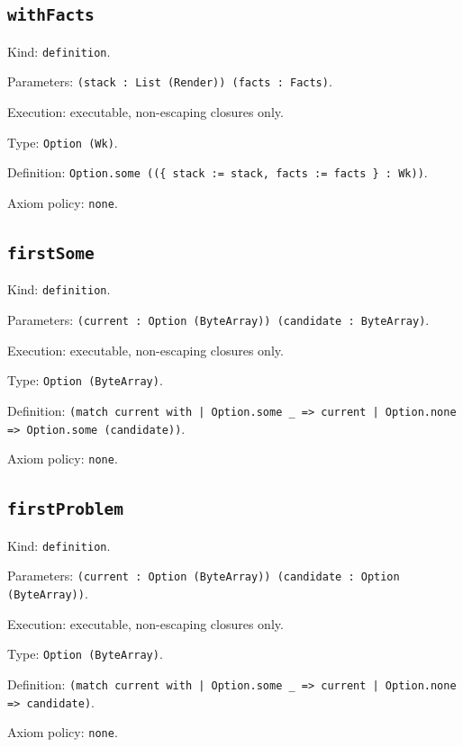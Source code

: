 \documentclass[11pt]{article}
\begin{document}
\subsection*{\texttt{withFacts}}
\noindent Kind: \texttt{definition}.\par
\noindent Parameters: \texttt{(stack : List (Render)) (facts : Facts)}.\par
\noindent Execution: executable, non-escaping closures only.\par
\noindent Type: \texttt{Option (Wk)}.\par
\noindent Definition: \texttt{Option.some ((\{ stack := stack, facts := facts \} : Wk))}.\par
\noindent Axiom policy: \texttt{none}.\par
\subsection*{\texttt{firstSome}}
\noindent Kind: \texttt{definition}.\par
\noindent Parameters: \texttt{(current : Option (ByteArray)) (candidate : ByteArray)}.\par
\noindent Execution: executable, non-escaping closures only.\par
\noindent Type: \texttt{Option (ByteArray)}.\par
\noindent Definition: \texttt{(match current with | Option.some \_ => current | Option.none => Option.some (candidate))}.\par
\noindent Axiom policy: \texttt{none}.\par
\subsection*{\texttt{firstProblem}}
\noindent Kind: \texttt{definition}.\par
\noindent Parameters: \texttt{(current : Option (ByteArray)) (candidate : Option (ByteArray))}.\par
\noindent Execution: executable, non-escaping closures only.\par
\noindent Type: \texttt{Option (ByteArray)}.\par
\noindent Definition: \texttt{(match current with | Option.some \_ => current | Option.none => candidate)}.\par
\noindent Axiom policy: \texttt{none}.\par
\end{document}
